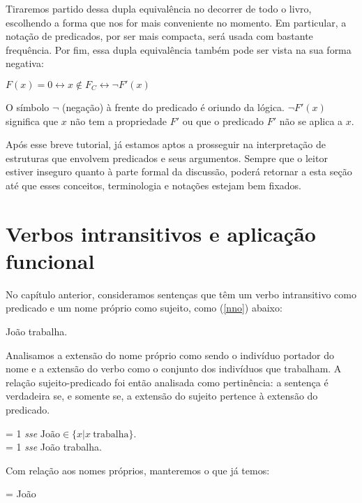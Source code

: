 \n Tiraremos partido dessa dupla equivalência no decorrer de todo o livro, escolhendo a forma que nos for mais conveniente no momento. Em particular, a notação de predicados, por ser mais compacta, será usada com bastante frequência. Por fim, essa dupla equivalência também pode ser vista na sua forma negativa:

\begin{exe}
	\ex $F(x)=0 \leftrightarrow x \notin F_C \leftrightarrow \neg F'(x)$
\end{exe}

\n O símbolo $\neg$ (negação) à frente do predicado é oriundo da lógica. $\neg F'(x)$ significa que $x$ não tem a propriedade $F'$ ou que o predicado $F'$ não se aplica a $x$. 
 

Após esse breve tutorial, já estamos aptos a prosseguir na interpretação de estruturas que envolvem predicados e seus argumentos. Sempre que o leitor estiver inseguro quanto à parte formal da discussão, poderá retornar a esta seção até que esses conceitos, terminologia e notações estejam bem fixados.


\section{Verbos intransitivos e aplicação funcional}

No capítulo anterior, consideramos sentenças que têm um verbo intransitivo como predicado e um nome próprio como sujeito, como (\ref{nno}) abaixo:

\begin{exe}
	\ex João trabalha.\label{nno}
\end{exe}

\n Analisamos a extensão do nome próprio como sendo o indivíduo portador do nome e a extensão do verbo como o conjunto dos indivíduos que trabalham. A relação sujeito-predicado foi então analisada como pertinência: a sentença é verdadeira se, e somente se, a extensão do sujeito pertence à extensão do predicado.

\begin{exe}
	\ex {}  = 1 \textit{sse} $\text{João} \in \{x | x\ \text{trabalha}\}$.\\
	  = 1 \textit{sse} João trabalha.
\end{exe}


\noindent Com relação aos nomes próprios, manteremos o que já temos:

\begin{exe}
	\ex {} = João
\end{exe}

